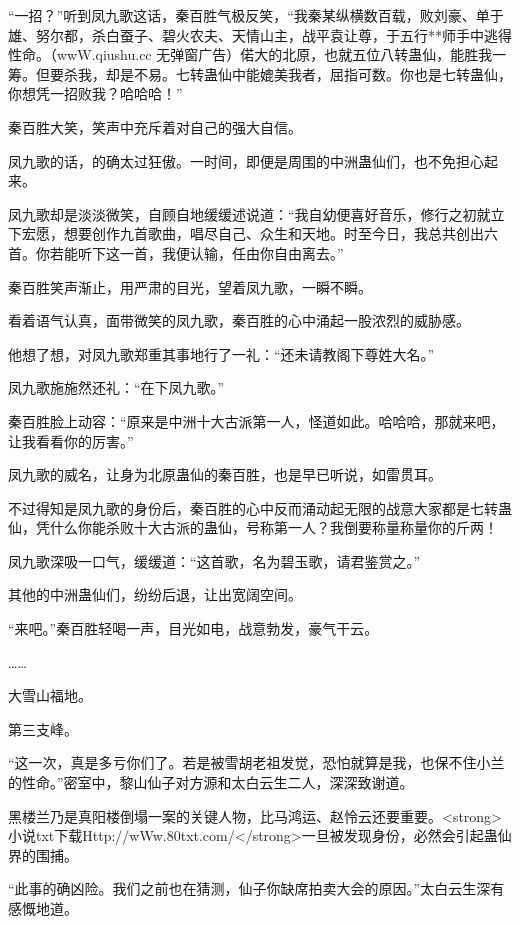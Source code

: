
\begin{this_body}

“一招？”听到凤九歌这话，秦百胜气极反笑，“我秦某纵横数百载，败刘豪、单于雄、努尔都，杀白蚕子、碧火农夫、天情山主，战平袁让尊，于五行**师手中逃得性命。（wwW.qiushu.cc 无弹窗广告）偌大的北原，也就五位八转蛊仙，能胜我一筹。但要杀我，却是不易。七转蛊仙中能媲美我者，屈指可数。你也是七转蛊仙，你想凭一招败我？哈哈哈！”

秦百胜大笑，笑声中充斥着对自己的强大自信。

凤九歌的话，的确太过狂傲。一时间，即便是周围的中洲蛊仙们，也不免担心起来。

凤九歌却是淡淡微笑，自顾自地缓缓述说道：“我自幼便喜好音乐，修行之初就立下宏愿，想要创作九首歌曲，唱尽自己、众生和天地。时至今日，我总共创出六首。你若能听下这一首，我便认输，任由你自由离去。”

秦百胜笑声渐止，用严肃的目光，望着凤九歌，一瞬不瞬。

看着语气认真，面带微笑的凤九歌，秦百胜的心中涌起一股浓烈的威胁感。

他想了想，对凤九歌郑重其事地行了一礼：“还未请教阁下尊姓大名。”

凤九歌施施然还礼：“在下凤九歌。”

秦百胜脸上动容：“原来是中洲十大古派第一人，怪道如此。哈哈哈，那就来吧，让我看看你的厉害。”

凤九歌的威名，让身为北原蛊仙的秦百胜，也是早已听说，如雷贯耳。

不过得知是凤九歌的身份后，秦百胜的心中反而涌动起无限的战意大家都是七转蛊仙，凭什么你能杀败十大古派的蛊仙，号称第一人？我倒要称量称量你的斤两！

凤九歌深吸一口气，缓缓道：“这首歌，名为碧玉歌，请君鉴赏之。”

其他的中洲蛊仙们，纷纷后退，让出宽阔空间。

“来吧。”秦百胜轻喝一声，目光如电，战意勃发，豪气干云。

……

大雪山福地。

第三支峰。

“这一次，真是多亏你们了。若是被雪胡老祖发觉，恐怕就算是我，也保不住小兰的性命。”密室中，黎山仙子对方源和太白云生二人，深深致谢道。

黑楼兰乃是真阳楼倒塌一案的关键人物，比马鸿运、赵怜云还要重要。<strong>小说txt下载Http://wWw.80txt.com/</strong>一旦被发现身份，必然会引起蛊仙界的围捕。

“此事的确凶险。我们之前也在猜测，仙子你缺席拍卖大会的原因。”太白云生深有感慨地道。


\end{this_body}
